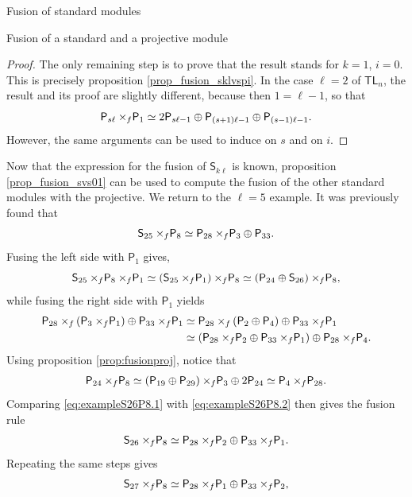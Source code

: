 \documentclass[reqno]{amsart}
\newcommand{\tl}[1]{\mathsf{TL}_{#1}}
\newcommand{\ds}[1]{\mathsf S_{#1}}
\newcommand{\dP}[1]{\mathsf P_{#1}}
\newcommand{\xf}{\times\hspace{-0.27em}_f}
\newcommand{\lc}{\ell}
\begin{document}
\begin{section}{Fusion of standard modules}
\begin{subsection}{Fusion of a standard and a projective module}
\begin{proof}
The only remaining step is to prove that the result stands for $k=1$, $i=0$. This is precisely proposition \ref{prop_fusion_sklvspi}. In the case $\lc =2$ of $\tl{n}$, the result and its proof are slightly different, because then $1 = \lc -1$, so that
\begin{equation*}
 \dP{s \lc} \xf \dP{1} \simeq 2\dP{s \lc -1} \oplus \dP{(s+1)\lc -1}\oplus \dP{(s-1)\lc -1}.
\end{equation*}
However, the same arguments can be used to induce on $s$ and on $i$.
\end{proof}
Now that the expression for the fusion of $\ds{k \lc}$ is known, proposition \ref{prop_fusion_svs01} can be used to compute the fusion of the other standard modules with the projective. We return to the $\lc=5$ example. It was previously found that
\begin{equation*}
\ds{25} \xf \dP{8} \simeq \dP{28}\xf \dP{3} \oplus \dP{33}.
\end{equation*}
Fusing the left side with $\dP{1}$ gives,
\begin{equation}\label{eq:exampleS26P8.1}
	\ds{25} \xf \dP{8} \xf \dP{1} \simeq \left(\ds{25} \xf \dP{1}\right) \xf \dP{8} \simeq \left( \dP{24} \oplus \ds{26} \right) \xf \dP{8},
\end{equation}
while fusing the right side with $\dP{1}$ yields
\begin{align}\label{eq:exampleS26P8.2}
	\dP{28} \xf \left(\dP{3}\xf \dP{1}\right) \oplus \dP{33}\xf \dP{1} & \simeq \dP{28} \xf \left(\dP{2} \oplus \dP{4}  \right) \oplus \dP{33} \xf \dP{1} \notag \\
	& \simeq \left( \dP{28} \xf \dP{2} \oplus \dP{33} \xf \dP{1} \right) \oplus \dP{28} \xf \dP{4}.
\end{align}
Using proposition \ref{prop:fusionproj}, notice that
\begin{align*}
	\dP{24} \xf \dP{8} \simeq \left(\dP{19} \oplus \dP{29}\right)\xf \dP{3} \oplus 2 \dP{24}\simeq \dP{4} \xf \dP{28}.
\end{align*}
Comparing \eqref{eq:exampleS26P8.1} with \eqref{eq:exampleS26P8.2} then gives the fusion rule
\begin{equation}
	\ds{26} \xf \dP{8} \simeq  \dP{28} \xf \dP{2} \oplus \dP{33} \xf \dP{1}.
\end{equation}
Repeating the same steps gives
\begin{equation}
	\ds{27} \xf \dP{8} \simeq  \dP{28} \xf \dP{1} \oplus \dP{33} \xf \dP{2},
\end{equation}
\begin{equation}

\end{equation}
\end{subsection}
\end{section}
\end{document}
